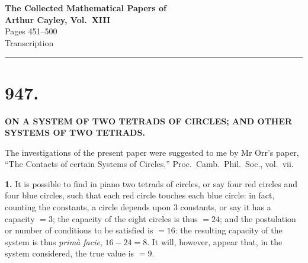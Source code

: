\documentclass[12pt,a4paper]{article}
\newcommand{\primd}{\textit{prim\`a facie}}
\begin{document}
\begin{center}
{\Large\bfseries The Collected Mathematical Papers of\\[0.5em] Arthur Cayley, Vol.~XIII}\\[1em]
{\large Pages 451--500}\\[0.5em]
{\normalsize Transcription}
\end{center}

\hrule
\vspace{1em}


\section*{947.}

\begin{center}
{\large\bfseries ON A SYSTEM OF TWO TETRADS OF CIRCLES; AND OTHER SYSTEMS OF TWO TETRADS.}
\end{center}

\begin{flushright}
\end{flushright}

The investigations of the present paper were suggested to me by Mr Orr's paper, ``The Contacts of certain Systems of Circles,'' Proc.~Camb.~Phil.~Soc., vol.~vii.

\textbf{1.} It is possible to find in piano two tetrads of circles, or say four red circles and four blue circles, such that each red circle touches each blue circle: in fact, counting the constants, a circle depends upon 3 constants, or say it has a capacity $=3$; the capacity of the eight circles is thus $=24$; and the postulation or number of conditions to be satisfied is $=16$: the resulting capacity of the system is thus \primd, $16-24=8$. It will, however, appear that, in the system considered, the true value is $=9$.
\end{document}
